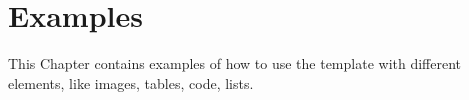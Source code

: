\chapter{Examples}\label{ch:Examples}
This Chapter contains examples of how to use the template with different elements, like images, tables, code, lists.






